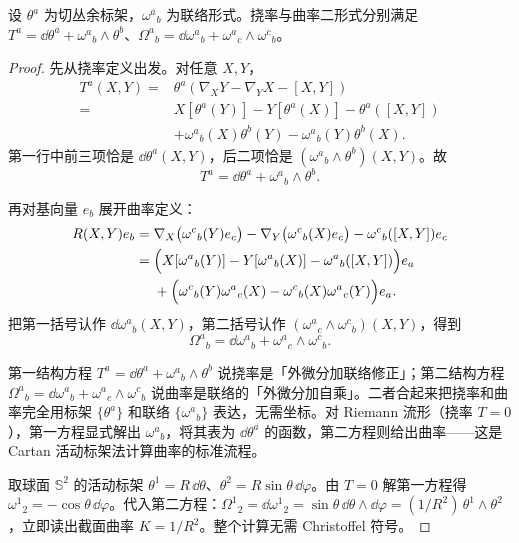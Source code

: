 \begin{theorem}
设 $\theta^a$ 为切丛余标架，$\omega^a{}_b$ 为联络形式。挠率与曲率二形式分别满足 $T^a=\dd\theta^a+\omega^a{}_b\wedge\theta^b$、$\Omega^a{}_b=\dd\omega^a{}_b+\omega^a{}_c\wedge\omega^c{}_b$。
\end{theorem}
\begin{proof}
先从挠率定义出发。对任意 $X,Y$，
\[
\begin{aligned}
T^a(X,Y)
={}&\theta^a(\nabla_XY-\nabla_YX-[X,Y])\\
={}&X[\theta^a(Y)]-Y[\theta^a(X)]-\theta^a([X,Y])\\
&+\omega^a{}_b(X)\theta^b(Y)
-\omega^a{}_b(Y)\theta^b(X).
\end{aligned}
\]
第一行中前三项恰是 $\dd\theta^a(X,Y)$，后二项恰是
$(\omega^a{}_b\wedge\theta^b)(X,Y)$。故
\begin{equation}\label{eq:math-dg-synthesis-cartan-first}
{T^a=\dd\theta^a+\omega^a{}_b\wedge\theta^b.}
\end{equation}

再对基向量 $e_b$ 展开曲率定义：
\[
\begin{aligned}
R(X,Y)e_b
={}&\nabla_X\bigl(\omega^c{}_b(Y)e_c\bigr)
-\nabla_Y\bigl(\omega^c{}_b(X)e_c\bigr)
-\omega^c{}_b([X,Y])e_c\\
={}&\Bigl(
X[\omega^a{}_b(Y)]-Y[\omega^a{}_b(X)]-\omega^a{}_b([X,Y])
\Bigr)e_a\\
&+\Bigl(
\omega^c{}_b(Y)\omega^a{}_c(X)
-\omega^c{}_b(X)\omega^a{}_c(Y)
\Bigr)e_a.
\end{aligned}
\]
把第一括号认作 $\dd\omega^a{}_b(X,Y)$，第二括号认作
$(\omega^a{}_c\wedge\omega^c{}_b)(X,Y)$，得到
\begin{equation}\label{eq:math-dg-synthesis-cartan-second}
{
\Omega^a{}_b
=\dd\omega^a{}_b+\omega^a{}_c\wedge\omega^c{}_b.}
\end{equation}

第一结构方程 $T^a=\dd\theta^a+\omega^a{}_b\wedge\theta^b$ 说挠率是「外微分加联络修正」；第二结构方程 $\Omega^a{}_b=\dd\omega^a{}_b+\omega^a{}_c\wedge\omega^c{}_b$ 说曲率是联络的「外微分加自乘」。二者合起来把挠率和曲率完全用标架 $\{\theta^a\}$ 和联络 $\{\omega^a{}_b\}$ 表达，无需坐标。对 Riemann 流形（挠率 $T=0$），第一方程显式解出 $\omega^a{}_b$，将其表为 $\dd\theta^a$ 的函数，第二方程则给出曲率——这是 Cartan 活动标架法计算曲率的标准流程。

取球面 $\mathbb S^2$ 的活动标架 $\theta^1=R\,\dd\theta$、$\theta^2=R\sin\theta\,\dd\varphi$。由 $T=0$ 解第一方程得 $\omega^1{}_2=-\cos\theta\,\dd\varphi$。代入第二方程：$\Omega^1{}_2=\dd\omega^1{}_2=\sin\theta\,\dd\theta\wedge\dd\varphi=(1/R^2)\,\theta^1\wedge\theta^2$，立即读出截面曲率 $K=1/R^2$。整个计算无需 Christoffel 符号。
\end{proof}

